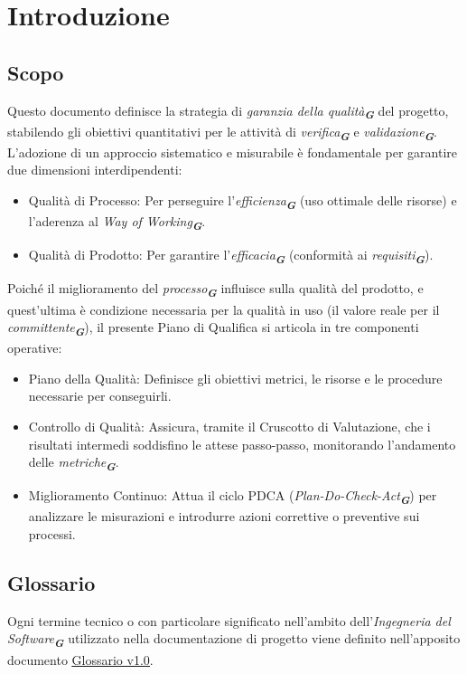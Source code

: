 \documentclass[a4paper,12pt]{article}
\newcommand{\glossario}[1]{\textit{#1}\textsubscript{\textbf{\textit{\textcolor{lightblack}{G}}}}}
\begin{document}
\section{Introduzione}

\subsection{Scopo}
Questo documento definisce la strategia di \glossario{garanzia della qualità} del progetto, stabilendo gli obiettivi quantitativi per le attività di \glossario{verifica} e \glossario{validazione}. L'adozione di un approccio sistematico e misurabile è fondamentale per garantire due dimensioni interdipendenti:
\begin{itemize}
    \item Qualità di Processo: Per perseguire l'\glossario{efficienza} (uso ottimale delle risorse) e l'aderenza al \glossario{Way of Working}.
    \item Qualità di Prodotto: Per garantire l'\glossario{efficacia} (conformità ai \glossario{requisiti}).
\end{itemize}

Poiché il miglioramento del \glossario{processo} influisce sulla qualità del prodotto, e quest'ultima è condizione necessaria per la qualità in uso (il valore reale per il \glossario{committente}), il presente Piano di Qualifica si articola in tre componenti operative:
\begin{itemize}
    \item Piano della Qualità: Definisce gli obiettivi metrici, le risorse e le procedure necessarie per conseguirli.
    \item Controllo di Qualità: Assicura, tramite il Cruscotto di Valutazione, che i risultati intermedi soddisfino le attese passo-passo, monitorando l'andamento delle \glossario{metriche}.
    \item Miglioramento Continuo: Attua il ciclo PDCA (\glossario{Plan-Do-Check-Act}) per analizzare le misurazioni e introdurre azioni correttive o preventive sui processi.
\end{itemize}


\subsection{Glossario}
Ogni termine tecnico o con particolare significato nell'ambito dell'\glossario{Ingegneria del Software} utilizzato nella documentazione di progetto viene definito nell'apposito documento \href{https://7-zpus.github.io/Docs/assets/pdf/RTB/Glossario.pdf}{\ul{Glossario v1.0}}.
\end{document}
